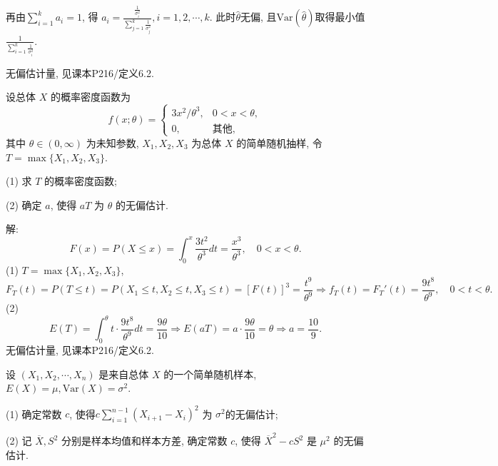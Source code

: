 \documentclass[standard]{ExBook}
\renewenvironment{shaded}{%
  \def\FrameCommand{\fboxsep=\FrameSep \colorbox{shadecolor}}%
  \MakeFramed{\advance\hsize-\width \FrameRestore}%
}{%
  \endMakeFramed
}
\begin{document}
\begin{qitems}
再由$\sum\limits_{i=1}^{k}a_i=1$, 得
$
a_i=\frac{\frac{1}{\sigma_i^2}}{\sum\limits_{j=1}^{k}\frac{1}{\sigma_j^2}},
i=1,2,\cdots,k.
$
此时$\hat{\theta}$无偏, 且$\mathrm{Var}(\hat{\theta})$取得最小值
$
\frac{1}{\sum\limits_{i=1}^{k}\frac{1}{\sigma_i^2}}
$.

\textcolor{themeColor}{\selectfont {} 无偏估计量, 见课本P216/定义6.2.}

\vspace{2.5cm-5em}

    \begin{bbox}
    \begin{shaded}
        \qitem
设总体 \( X \) 的概率密度函数为
\[f(x;\theta) = 
\begin{cases} 
3x^2/\theta^3, & 0 < x < \theta, \\
0, & \text{其他},
\end{cases}\]
其中 \(\theta \in (0,\infty)\) 为未知参数, \(X_1, X_2, X_3\) 为总体 \(X\) 的简单随机抽样, 令 \(T = \max\{X_1, X_2, X_3\}\).

(1) 求 \(T\) 的概率密度函数;

(2) 确定 \(a\), 使得 \(aT\) 为 \(\theta\) 的无偏估计.
    \end{shaded}
    \end{bbox}

\vspace{\dimexpr2.5cm-5em\relax}

解:
$$
F(x)=P(X\leq x)=\int_{0}^{x}\frac{3t^2}{\theta^3}dt
=\frac{x^3}{\theta^3},\quad 0<x<\theta.
$$
(1) $T=\max\{X_1,X_2,X_3\}$,
$$
F_T(t)=P(T\leq t)=P(X_1\leq t,X_2\leq t,X_3\leq t)
=[F(t)]^3
=\frac{t^9}{\theta^9}
\Longrightarrow
f_T(t)=F_T'(t)=\frac{9t^8}{\theta^9},\quad 0<t<\theta.
$$
(2)
$$
E(T)=\int_{0}^{\theta}t\cdot\frac{9t^8}{\theta^9}dt
=\frac{9\theta}{10}
\Longrightarrow
E(aT)=a\cdot\frac{9\theta}{10}=\theta
\Longrightarrow
a=\frac{10}{9}.
$$
\textcolor{themeColor}{\selectfont {} 无偏估计量, 见课本P216/定义6.2.}

\vspace{2.5cm-5em}

    \begin{bbox}
    \begin{shaded}
        \qitem
设 \((X_1, X_2, \cdots, X_n)\) 是来自总体 \(X\) 的一个简单随机样本, \(E(X) = \mu, \text{Var}(X) = \sigma^2\).

(1) 确定常数 \(c\), 使得\(c \displaystyle\sum\limits_{i=1}^{n-1} (X_{i+1} - X_i)^2\) 为 \(\sigma^2\)的无偏估计;

(2) 记 \(\overline{X}, S^2\) 分别是样本均值和样本方差, 确定常数 \(c\), 使得 \(\overline{X}^2 - cS^2\) 是 \(\mu^2\) 的无偏估计.
    \end{shaded}
    \end{bbox}


\end{qitems}
\end{document}
